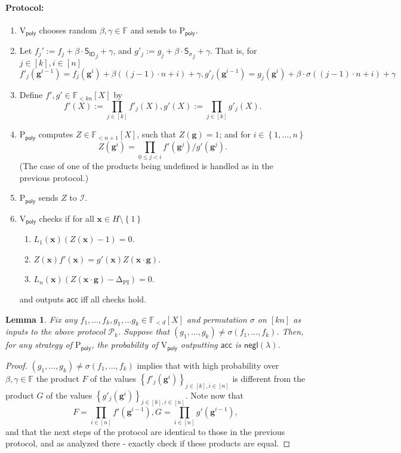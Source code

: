 \documentclass[11pt]{article} %
\newcommand{\x}{\ensuremath{\mathbf{x}}\xspace}
\newcommand{\F}{\ensuremath{\mathbb F}\xspace}
\newcommand{\sigof}[1]{\ensuremath{\sigma(#1)}\xspace}
\newcommand{\proverexp}{\ensuremath{\mathsf{e}}\xspace}
\newcommand{\pubinputdelta}{\ensuremath{\mathrm{\Delta_{\mathrm{PI}}}}\xspace}
\newcommand{\negl}{\ensuremath{\mathsf{negl}(\lambda)}\xspace}
\newcommand{\acc}{\ensuremath{\mathsf{acc}}\xspace}
\newcommand{\defeq}{:=}
\newcommand{\dom}{\ensuremath{H\setminus\set{1}}\xspace}
\newcommand{\sett}[2]{\ensuremath{\set{#1}_{#2}}\xspace}
\newcommand{\prvpoly}{\ensuremath{\mathrm{P_{\mathsf{poly}}}}\xspace}
\newcommand{\verpoly}{\ensuremath{\mathrm{V_{\mathsf{poly}}}}\xspace}
\newcommand{\ideal}{\ensuremath{\mathcal{I}}\xspace}
\newcommand{\set}[1]{\ensuremath{\left\{#1\right\}}\xspace}
\newcommand{\hgen}{\ensuremath{\mathbf{g}}\xspace}
\newcommand{\polysofdeg}[1]{\ensuremath{\F_{< #1}[X]}\xspace}
\newcommand{\prot}{\ensuremath{\mathscr{P}}\xspace}
\newcommand{\sigpoly}{\ensuremath{\mathsf{S_{\sigma}}}\xspace}
\newcommand{\idpoly}{\ensuremath{\mathsf{S_{ID}}}\xspace}
\newtheorem{lemma}{Lemma}[section]
\newcommand{\protmany}{\ensuremath{ {\prot}_k}\xspace}
\begin{document}
\paragraph{Protocol:}
\begin{enumerate}
 \item\label{item:betgamma} \verpoly chooses random $\beta,\gamma \in\F$ and sends to \prvpoly.
 \item Let $f_j'\defeq f_j+\beta\cdot  \idpoly_j +\gamma$, and $ g'_j\defeq g_j+\beta\cdot \sigpoly_j + \gamma$.
That is, for $j\in [k],i\in [n]$
 \[f'_j(\hgen^{i-1}) = f_j(\hgen^{i}) + \beta((j-1)\cdot n + i) + \gamma,
 g'_j(\hgen^{i-1}) = g_j(\hgen^{i}) + \beta\cdot \sigma((j-1)\cdot n + i) + \gamma\]
\item Define $f',g' \in \polysofdeg{kn}$ by 
\[f'(X) \defeq \prod_{j\in [k]} f'_j(X),g'(X) \defeq \prod_{j\in [k]} g'_j(X).\]
 
 \item \prvpoly computes $Z \in \polysofdeg{n+1}$, such that 
 $Z(\hgen) =1$; and for $i\in \set{1,\ldots,n}$
 \[Z(\hgen^i)  = \prod_{0\leq j <i} f'(\hgen^j)/g'(\hgen^j).\]
 (The case of one of the products being undefined is handled as in the previous protocol.)
 
 
 \item \prvpoly sends $Z$ to \ideal.
 \item \verpoly checks if for all $\x\in \dom$
 \begin{enumerate}
  \item $L_1(\x) (Z(\x)-1) =0$.
  \item $Z(\x)f'(\x) = g'(\x)Z(\x\cdot \hgen)$.
  \item $L_n(\x)(Z(\x\cdot \hgen)-\pubinputdelta)=0$.
 \end{enumerate}
 and outputs \acc iff all checks hold.
\end{enumerate}
\begin{lemma}\label{lem:permprotocolmany}
Fix any $f_1,\ldots,f_k,g_1,\ldots g_k \in \polysofdeg{d}$ and permutation $\sigma$ on $[kn]$ as inputs to the above protocol \protmany.
Suppose that $(g_1,\ldots,g_k) \neq \sigof{f_1,\ldots,f_k}$.
Then, for any strategy of \prvpoly, the probability of \verpoly outputting \acc is \negl.

\end{lemma}
\begin{proof}
 $(g_1,\ldots,g_k) \neq \sigof{f_1,\ldots,f_k}$ implies that with high probability over $\beta,\gamma \in \F$ the product $F$ of the values 
 \sett{f'_j(\hgen^i)}{j\in [k],i\in [n]} is different from the product $G$ of the values
 \sett{g'_j(\hgen^i)}{j\in [k],i\in [n]}.
 Note now that 
    \[F=\prod_{i\in [n]} f'(\hgen^{i-1}), G=\prod_{i\in [n]} g'(\hgen^{i-1}),\]
 and that the next steps of the protocol are identical to those in the previous protocol,
 and as analyzed there - exactly check if these products are equal.
\end{proof}
 
\end{document}
